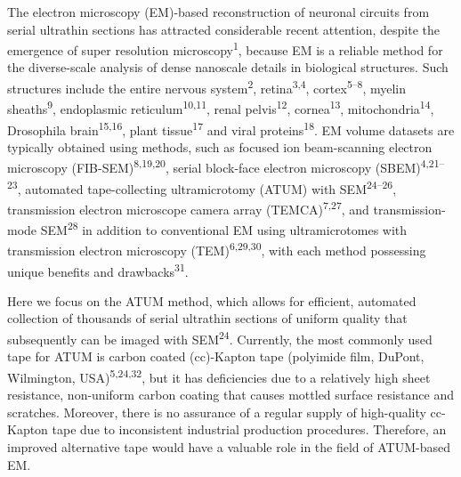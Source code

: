 \documentclass{article}
\begin{document}
The electron microscopy (EM)-based reconstruction of neuronal circuits from serial ultrathin sections has attracted considerable recent attention, despite the emergence of super resolution microscopy\textsuperscript{1}, because EM is a reliable method for the diverse-scale analysis of dense nanoscale details in biological structures. Such structures include the entire nervous system\textsuperscript{2}, retina\textsuperscript{3,4}, cortex\textsuperscript{5–8}, myelin sheaths\textsuperscript{9}, endoplasmic reticulum\textsuperscript{10,11}, renal pelvis\textsuperscript{12}, cornea\textsuperscript{13}, mitochondria\textsuperscript{14}, Drosophila brain\textsuperscript{15,16}, plant tissue\textsuperscript{17} and viral proteins\textsuperscript{18}. EM volume datasets are typically obtained using methods, such as focused ion beam-scanning electron microscopy (FIB-SEM)\textsuperscript{8,19,20}, serial block-face electron microscopy (SBEM)\textsuperscript{4,21–23}, automated tape-collecting ultramicrotomy (ATUM) with SEM\textsuperscript{24–26}, transmission electron microscope camera array (TEMCA)\textsuperscript{7,27}, and transmission-mode SEM\textsuperscript{28} in addition to conventional EM using ultramicrotomes with transmission electron microscopy (TEM)\textsuperscript{6,29,30}, with each method possessing unique benefits and drawbacks\textsuperscript{31}.

Here we focus on the ATUM method, which allows for efficient, automated collection of thousands of serial ultrathin sections of uniform quality that subsequently can be imaged with SEM\textsuperscript{24}. Currently, the most commonly used tape for ATUM is carbon coated (cc)-Kapton tape (polyimide film, DuPont, Wilmington, USA)\textsuperscript{5,24,32}, but it has deficiencies due to a relatively high sheet resistance, non-uniform carbon coating that causes mottled surface resistance and scratches. Moreover, there is no assurance of a regular supply of high-quality cc-Kapton tape due to inconsistent industrial production procedures. Therefore, an improved alternative tape would have a valuable role in the field of ATUM-based EM.
\end{document}
